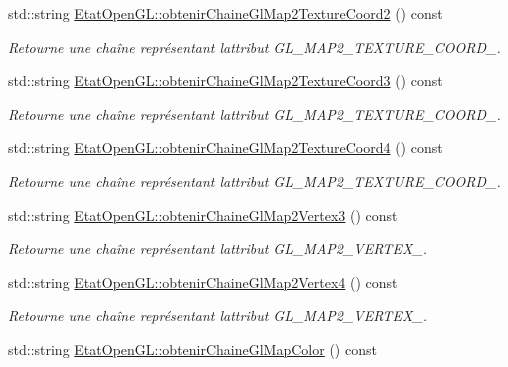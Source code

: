 \begin{DoxyCompactItemize}
std\+::string \hyperlink{group__utilitaire_gaf5cb23274f1ad4c504c5aed7947a3432}{Etat\+Open\+G\+L\+::obtenir\+Chaine\+Gl\+Map2\+Texture\+Coord2} () const 
\begin{DoxyCompactList}\small\item\em Retourne une chaîne représentant l\textquotesingle{}attribut G\+L\+\_\+\+M\+A\+P2\+\_\+\+T\+E\+X\+T\+U\+R\+E\+\_\+\+C\+O\+O\+R\+D\+\_. \end{DoxyCompactList}\item 
std\+::string \hyperlink{group__utilitaire_gad4b636ae980e2c420c9a7357fe8d58cc}{Etat\+Open\+G\+L\+::obtenir\+Chaine\+Gl\+Map2\+Texture\+Coord3} () const 
\begin{DoxyCompactList}\small\item\em Retourne une chaîne représentant l\textquotesingle{}attribut G\+L\+\_\+\+M\+A\+P2\+\_\+\+T\+E\+X\+T\+U\+R\+E\+\_\+\+C\+O\+O\+R\+D\+\_. \end{DoxyCompactList}\item 
std\+::string \hyperlink{group__utilitaire_ga0716a8c85e544f43620ea6664c58b570}{Etat\+Open\+G\+L\+::obtenir\+Chaine\+Gl\+Map2\+Texture\+Coord4} () const 
\begin{DoxyCompactList}\small\item\em Retourne une chaîne représentant l\textquotesingle{}attribut G\+L\+\_\+\+M\+A\+P2\+\_\+\+T\+E\+X\+T\+U\+R\+E\+\_\+\+C\+O\+O\+R\+D\+\_. \end{DoxyCompactList}\item 
std\+::string \hyperlink{group__utilitaire_ga7d031ab910660e0f56b3ed4a95d2bfc6}{Etat\+Open\+G\+L\+::obtenir\+Chaine\+Gl\+Map2\+Vertex3} () const 
\begin{DoxyCompactList}\small\item\em Retourne une chaîne représentant l\textquotesingle{}attribut G\+L\+\_\+\+M\+A\+P2\+\_\+\+V\+E\+R\+T\+E\+X\+\_. \end{DoxyCompactList}\item 
std\+::string \hyperlink{group__utilitaire_ga866e31b0b0469c11f0c0bee0bb4f9973}{Etat\+Open\+G\+L\+::obtenir\+Chaine\+Gl\+Map2\+Vertex4} () const 
\begin{DoxyCompactList}\small\item\em Retourne une chaîne représentant l\textquotesingle{}attribut G\+L\+\_\+\+M\+A\+P2\+\_\+\+V\+E\+R\+T\+E\+X\+\_. \end{DoxyCompactList}\item 
std\+::string \hyperlink{group__utilitaire_ga7224b43655a9b3d8a381bea11d42d401}{Etat\+Open\+G\+L\+::obtenir\+Chaine\+Gl\+Map\+Color} () const 

\end{DoxyCompactItemize}
